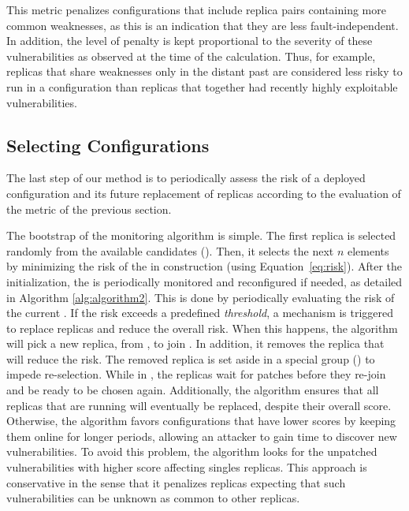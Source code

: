 This metric penalizes configurations that include replica pairs containing more common weaknesses, as this is an indication that they are less fault-independent.
In addition, the level of penalty is kept proportional to the severity of these vulnerabilities as observed at the time of the calculation. 
Thus, for example, replicas that share weaknesses only in the distant past are considered less risky to run in a configuration than replicas that together had recently highly exploitable vulnerabilities.

\subsection{Selecting Configurations}
\label{sec:configurations}

The last step of our method is to periodically assess the risk of a deployed configuration and its future replacement of replicas according to the evaluation of the metric of the previous section.

The bootstrap of the monitoring algorithm is simple. 
The first replica is selected randomly from the available candidates (\RS).
Then, it selects the next $n$ elements by minimizing the risk of the \ES in construction (using Equation~\ref{eq:risk}).
After the initialization, the \ES is periodically monitored and reconfigured if needed, as detailed in Algorithm \ref{alg:algorithm2}.
This is done by periodically evaluating the risk of the current \ES. 
If the risk exceeds a predefined \emph{threshold}, a mechanism is triggered to replace replicas and reduce the overall risk.
When this happens, the algorithm will pick a new replica, from \RS, to join \ES. 
In addition, it removes the replica that will reduce the risk.
The removed replica is set aside in a special group (\QS) to impede re-selection.
While in \QS, the replicas wait for patches before they re-join \RS and be ready to be chosen again.
Additionally, the algorithm ensures that all replicas that are running will eventually be replaced, despite their overall score.
Otherwise, the algorithm favors configurations that have lower scores by keeping them online for longer periods, allowing an attacker to gain time to discover new vulnerabilities.
To avoid this problem, the algorithm looks for the unpatched vulnerabilities with higher score affecting singles replicas.
This approach is conservative in the sense that it penalizes replicas expecting that such vulnerabilities can be unknown as common to other replicas.

